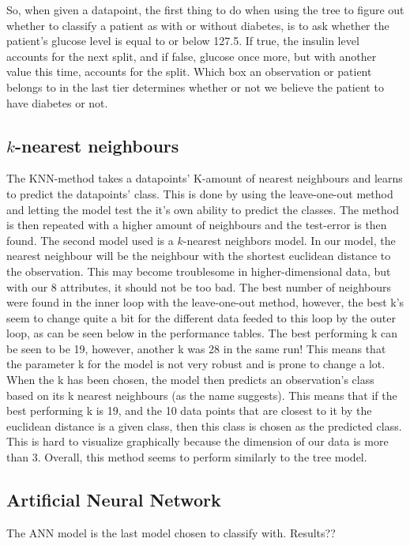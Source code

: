 So, when given a datapoint, the first thing to do when using the tree to figure
out whether to classify a patient as with or without diabetes, is to ask whether
the patient's glucose level is equal to or below 127.5. If true, the insulin level
accounts for the next split, and if false, glucose once more, but with another
value this time, accounts for the split. Which box an observation or patient belongs
to in the last tier determines whether or not we believe the patient to have diabetes
or not.

\subsection{$k$-nearest neighbours}
The KNN-method takes a datapoints' K-amount of nearest neighbours and learns to predict the datapoints' class.
This is done by using the leave-one-out method and letting the model test the it's own ability to predict the classes.
The method is then repeated with a higher amount of neighbours and the test-error is then found.
The second model used is a $k$-nearest neighbors model. In our model, the nearest
neighbour will be the neighbour with the shortest euclidean distance to the observation.
This may become troublesome in higher-dimensional data, but with our 8 attributes, it should
not be too bad. The best number of neighbours were found in the inner loop with
the leave-one-out method, however, the best k's seem to change quite a bit for the
different data feeded to this loop by the outer loop, as can be seen below in the performance
tables. The best performing k can be seen to be 19, however, another k was
28 in the same run! This means that the parameter k for the model is not very
robust and is prone to change a lot. When the k has been chosen, the model then
predicts an observation's class based on its k nearest neighbours (as the
name suggests). This means that if the best performing k is 19, and the 10
data points that are closest to it by the euclidean distance is a given class,
then this class is chosen as the predicted class. This is hard to visualize
graphically because the dimension of our data is more than 3. Overall, this
method seems to perform similarly to the tree model.

\subsection{Artificial Neural Network}
The ANN model is the last model chosen to classify with. Results??

